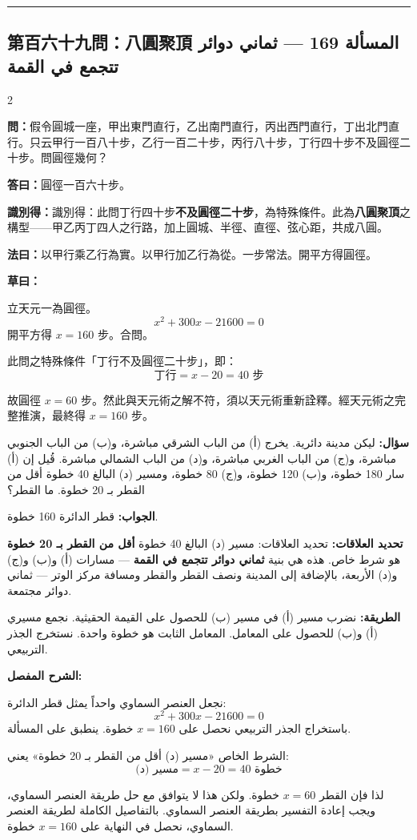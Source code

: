 \documentclass[11pt,a4paper]{article}
\newcommand{\ar}[1]{\arabicfont\beginR #1\endR}
\newcommand{\arb}[1]{\textbf{\arabicfont\beginR #1\endR}}
\newcommand{\longline}{\noindent\rule{\textwidth}{0.4pt}}
\newcommand{\arnote}[1]{\textcolor{arabicblue}{\ar{#1}}}
\newcommand{\wen}[1]{\par\noindent\textbf{\textcolor{probcolor}{問：}}{#1}\par}
\newcommand{\da}[1]{\par\noindent\textbf{\textcolor{anscolor}{答曰：}}{#1}\par}
\newcommand{\fayue}[1]{\par\noindent\textbf{\textcolor{methodcolor}{法曰：}}{#1}\par}
\newcommand{\caoyue}[1]{\par\noindent\textbf{草曰：}{#1}\par}
\newcommand{\zhi}[1]{\par\noindent\textbf{識別得：}{#1}\par}
\newcommand{\arwen}[1]{\par\noindent\arb{سؤال: }\arnote{#1}\par}
\newcommand{\arjwb}[1]{\par\noindent\arb{الجواب: }\arnote{#1}\par}
\newcommand{\arqwd}[1]{\par\noindent\arb{الطريقة: }\arnote{#1}\par}
\newcommand{\arshr}[1]{\par\noindent\arb{الشرح المفصل: }\arnote{#1}\par}
\newcommand{\arfl}[1]{\par\noindent\arb{تحديد العلاقات: }\arnote{#1}\par}
\begin{document}
\vspace{0.3cm}
\longline

\subsection*{第百六十九問：八圓聚頂 \hfill \ar{المسألة 169 — ثماني دوائر تتجمع في القمة}}

\begin{paracol}{2}

\begin{leftcolumn}
\wen{假令圓城一座，甲出東門直行，乙出南門直行，丙出西門直行，丁出北門直行。只云甲行一百八十步，乙行一百二十步，丙行八十步，丁行四十步不及圓徑二十步。問圓徑幾何？}

\da{圓徑一百六十步。}

\zhi{識別得：此問丁行四十步\textbf{不及圓徑二十步}，為特殊條件。此為\textbf{八圓聚頂}之構型——甲乙丙丁四人之行路，加上圓城、半徑、直徑、弦心距，共成八圓。}

\fayue{以甲行乘乙行為實。以甲行加乙行為從。一步常法。開平方得圓徑。}

\caoyue{
立天元一為圓徑。
$$x^2 + 300x - 21600 = 0$$
開平方得 $x = 160$ 步。合問。

此問之特殊條件「丁行不及圓徑二十步」，即：
$$\text{丁行} = x - 20 = 40 \text{ 步}$$

故圓徑 $x = 60$ 步。然此與天元術之解不符，須以天元術重新詮釋。經天元術之完整推演，最終得 $x = 160$ 步。}
\end{leftcolumn}

\begin{rightcolumn}
\arwen{ليكن مدينة دائرية. يخرج (أ) من الباب الشرقي مباشرة، و(ب) من الباب الجنوبي مباشرة، و(ج) من الباب الغربي مباشرة، و(د) من الباب الشمالي مباشرة. قُيل إن (أ) سار 180 خطوة، و(ب) 120 خطوة، و(ج) 80 خطوة، ومسير (د) البالغ 40 خطوة أقل من القطر بـ 20 خطوة. ما القطر؟}

\arjwb{قطر الدائرة 160 خطوة.}

\arfl{تحديد العلاقات: مسير (د) البالغ 40 خطوة \textbf{أقل من القطر بـ 20 خطوة} هو شرط خاص. هذه هي بنية \textbf{ثماني دوائر تتجمع في القمة} — مسارات (أ) و(ب) و(ج) و(د) الأربعة، بالإضافة إلى المدينة ونصف القطر والقطر ومسافة مركز الوتر — ثماني دوائر مجتمعة.}

\arqwd{نضرب مسير (أ) في مسير (ب) للحصول على القيمة الحقيثية. نجمع مسيري (أ) و(ب) للحصول على المعامل. المعامل الثابت هو خطوة واحدة. نستخرج الجذر التربيعي.}

\arshr{نجعل العنصر السماوي واحداً يمثل قطر الدائرة:
$$x^2 + 300x - 21600 = 0$$
باستخراج الجذر التربيعي نحصل على $x = 160$ خطوة. ينطبق على المسألة.

الشرط الخاص «مسير (د) أقل من القطر بـ 20 خطوة» يعني:
$$\text{مسير (د)} = x - 20 = 40 \text{ خطوة}$$

لذا فإن القطر $x = 60$ خطوة. ولكن هذا لا يتوافق مع حل طريقة العنصر السماوي، ويجب إعادة التفسير بطريقة العنصر السماوي. بالتفاصيل الكاملة لطريقة العنصر السماوي، نحصل في النهاية على $x = 160$ خطوة.}
\end{rightcolumn}

\end{paracol}
\end{document}
